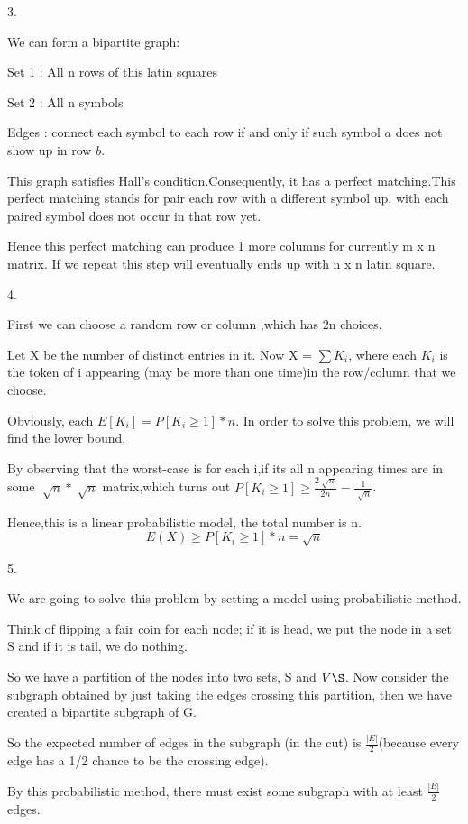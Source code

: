 \documentclass{article}
\begin{document}
3.

We can form a bipartite graph:

Set 1 : All n rows of this latin squares

Set 2 : All n symbols

Edges : connect each symbol to each row if and only if such symbol $a$ does not show up in row $b$.

This graph satisfies Hall’s condition.Consequently, it has a perfect matching.This perfect matching stands for pair each row with a different
symbol  up, with each paired symbol does not occur in that row yet. 

Hence this perfect matching can produce 1 more columns for currently m x n matrix. If we repeat this step will eventually ends up with n x n latin square.

4.

First we can choose a random row or column ,which has 2n choices. 

Let X be the number of distinct entries in it. Now X = $\sum K_i$, where each $K_i$ is the token of i appearing (may be more than one time)in the row/column that we choose. 

Obviously, each $E[K_i] = P [K_i \geq 1]*n$. In order to solve this problem, we will find the lower bound.

By observing that the worst-case is for each i,if its all n appearing times are in some $\sqrt[]{n} * \sqrt[]{n}$ matrix,which turns out $P [K_i \geq 1] \geq \frac{2\sqrt[]{n}}{2n} = \frac{1}{\sqrt[]{n}}$. 

Hence,this is a linear probabilistic model, the total number is n. $$E(X) \geq P [K_i \geq 1] * n = \sqrt{n}$$

5.

We are going to solve this problem by setting a model using probabilistic method.

Think of flipping a fair coin for each node; if it is head, we put the node in a set S and if it is tail, we do nothing.

So we have a partition of the nodes into two sets, S and $V \S$. Now consider the subgraph obtained by just taking the edges crossing this partition, then we have created a bipartite subgraph of G.

So the expected number of edges in the subgraph (in the cut) is $\frac{|E|}{2}$(because every edge has a 1/2 chance to be the crossing edge).

By this probabilistic method, there must exist some subgraph with at least $\frac{|E|}{2}$ edges.
\end{document}
